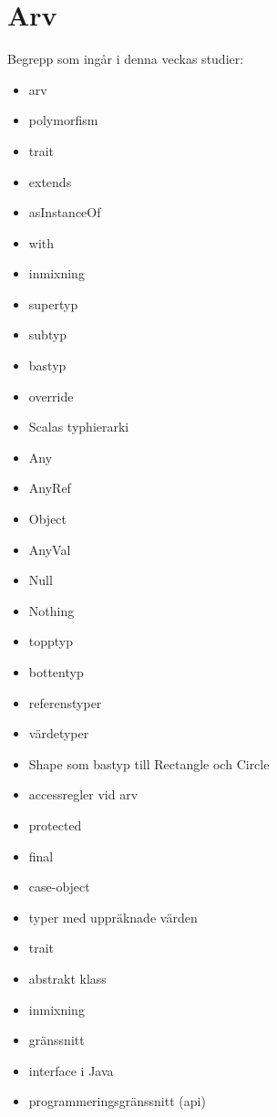 \chapter{Arv}\label{chapter:W09}
Begrepp som ingår i denna veckas studier:
\begin{multicols}{2}\begin{itemize}[noitemsep,label={$\square$},leftmargin=*]
\item arv
\item polymorfism
\item trait
\item extends
\item asInstanceOf
\item with
\item inmixning
\item supertyp
\item subtyp
\item bastyp
\item override
\item Scalas typhierarki
\item Any
\item AnyRef
\item Object
\item AnyVal
\item Null
\item Nothing
\item topptyp
\item bottentyp
\item referenstyper
\item värdetyper
\item Shape som bastyp till Rectangle och Circle
\item accessregler vid arv
\item protected
\item final
\item case-object
\item typer med uppräknade värden
\item trait
\item abstrakt klass
\item inmixning
\item gränssnitt
\item interface i Java
\item programmeringsgränssnitt (api)\end{itemize}\end{multicols}
